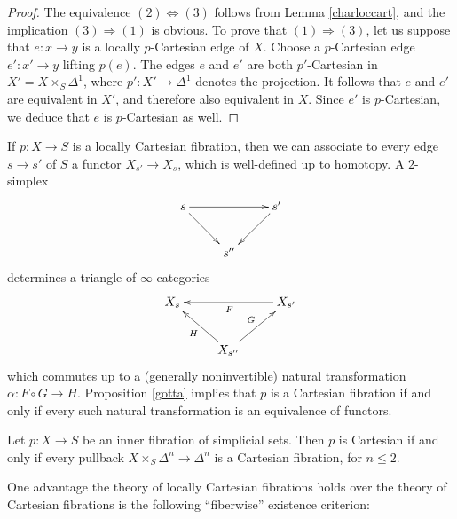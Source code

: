 \begin{proof}
The equivalence $(2) \Leftrightarrow (3)$ follows from Lemma \ref{charloccart}, and the implication $(3) \Rightarrow (1)$ is obvious. To prove that $(1) \Rightarrow (3)$, let us suppose that
$e: x \rightarrow y$ is a locally $p$-Cartesian edge of $X$. Choose a $p$-Cartesian edge
$e': x' \rightarrow y$ lifting $p(e)$. The edges $e$ and $e'$ are both $p'$-Cartesian in
$X' = X \times_{S} \Delta^1$, where $p': X' \rightarrow \Delta^1$ denotes the projection. It follows that $e$ and $e'$ are equivalent in $X'$, and therefore also equivalent in $X$. Since $e'$ is $p$-Cartesian, we deduce that $e$ is $p$-Cartesian as well.
\end{proof}

\begin{remark}
If $p: X \rightarrow S$ is a locally Cartesian fibration, then we can associate to every edge
$s \rightarrow s'$ of $S$ a functor $X_{s'} \rightarrow X_{s}$, which is well-defined up to homotopy.
A $2$-simplex
$$ \xymatrix{ s \ar[rr] \ar[dr] & & s' \ar[dl] \\
& s'' & }$$
determines a triangle of $\infty$-categories
$$ \xymatrix{ X_{s} & & X_{s'} \ar[ll]^{F} \\
& X_{s''} \ar[ul]^{H} \ar[ur]^{G} & }$$
which commutes up to a (generally noninvertible) natural transformation $\alpha: F \circ G \rightarrow H$. Proposition \ref{gotta} implies that $p$ is a Cartesian fibration if and only if every such natural transformation is an equivalence of functors.
\end{remark}
 
\begin{corollary}
Let $p: X \rightarrow S$ be an inner fibration of simplicial sets. Then $p$ is Cartesian if and only if every pullback $X \times_{S} \Delta^n \rightarrow \Delta^n$ is
a Cartesian fibration, for $n \leq 2$.
\end{corollary}
 
One advantage the theory of locally Cartesian fibrations holds over the theory of Cartesian fibrations is the following ``fiberwise'' existence criterion:

